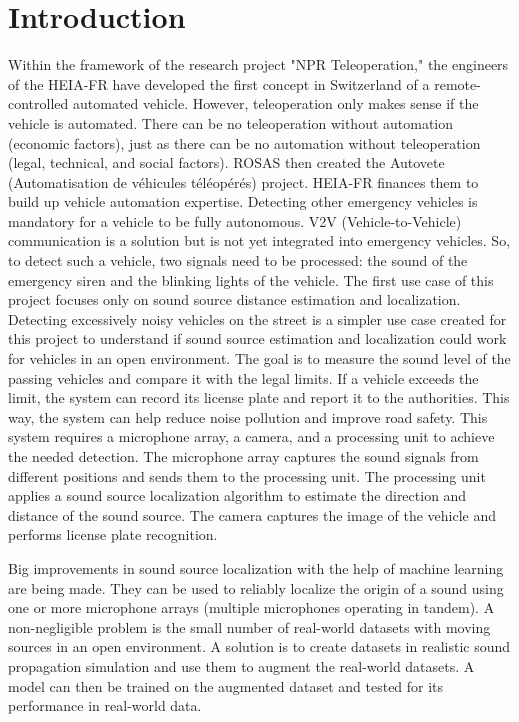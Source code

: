 \chapter{Introduction}
\label{ch:introduction}
Within the framework of the research project "NPR Teleoperation," the engineers of the HEIA-FR have developed the first concept in Switzerland of a remote-controlled automated vehicle. However, teleoperation only makes sense if the vehicle is automated. There can be no teleoperation without automation (economic factors), just as there can be no automation without teleoperation (legal, technical, and social factors). ROSAS then created the Autovete (Automatisation de véhicules téléopérés) project. HEIA-FR finances them to build up vehicle automation expertise. Detecting other emergency vehicles is mandatory for a vehicle to be fully autonomous. V2V (Vehicle-to-Vehicle) communication is a solution but is not yet integrated into emergency vehicles.
So, to detect such a vehicle, two signals need to be processed: the sound of the emergency siren and the blinking lights of the vehicle. The first use case of this project focuses only on sound source distance estimation and localization. Detecting excessively noisy vehicles on the street is a simpler use case created for this project to understand if sound source estimation and localization could work for vehicles in an open environment. The goal is to measure the sound level of the passing vehicles and compare it with the legal limits. If a vehicle exceeds the limit, the system can record its license plate and report it to the authorities. This way, the system can help reduce noise pollution and improve road safety. This system requires a microphone array, a camera, and a processing unit to achieve the needed detection. The microphone array captures the sound signals from different positions and sends them to the processing unit. The processing unit applies a sound source localization algorithm to estimate the direction and distance of the sound source. The camera captures the image of the vehicle and performs license plate recognition. 

Big improvements in sound source localization with the help of machine learning are being made. They can be used to reliably localize the origin of a sound using one or more microphone arrays (multiple microphones operating in tandem). A non-negligible problem is the small number of real-world datasets with moving sources in an open environment. A solution is to create datasets in realistic sound propagation simulation and use them to augment the real-world datasets. A model can then be trained on the augmented dataset and tested for its performance in real-world data. 

